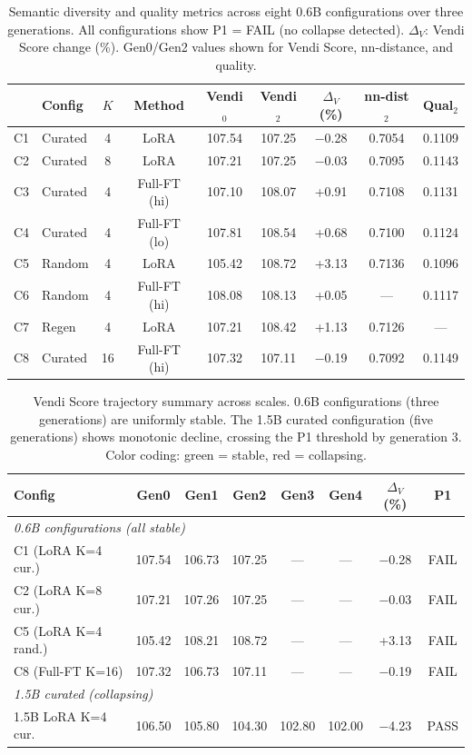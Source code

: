 \documentclass[11pt,a4paper]{article}
\begin{document}
\begin{table}[t]
\centering
\caption{Semantic diversity and quality metrics across eight 0.6B configurations over three generations. All configurations show P1 = FAIL (no collapse detected). $\Delta_V$: Vendi Score change (\%). Gen0/Gen2 values shown for Vendi Score, nn-distance, and quality.}
\label{tab:main}
\small
\begin{tabular}{@{}llccccccc@{}}
\toprule
& Config & $K$ & Method & Vendi$_0$ & Vendi$_2$ & $\Delta_V$(\%) & nn-dist$_2$ & Qual$_2$ \\
\midrule
C1 & Curated & 4 & LoRA & 107.54 & 107.25 & $-$0.28 & 0.7054 & 0.1109 \\
C2 & Curated & 8 & LoRA & 107.21 & 107.25 & $-$0.03 & 0.7095 & 0.1143 \\
C3 & Curated & 4 & Full-FT (hi) & 107.10 & 108.07 & +0.91 & 0.7108 & 0.1131 \\
C4 & Curated & 4 & Full-FT (lo) & 107.81 & 108.54 & +0.68 & 0.7100 & 0.1124 \\
C5 & Random & 4 & LoRA & 105.42 & 108.72 & +3.13 & 0.7136 & 0.1096 \\
C6 & Random & 4 & Full-FT (hi) & 108.08 & 108.13 & +0.05 & --- & 0.1117 \\
C7 & Regen & 4 & LoRA & 107.21 & 108.42 & +1.13 & 0.7126 & --- \\
C8 & Curated & 16 & Full-FT (hi) & 107.32 & 107.11 & $-$0.19 & 0.7092 & 0.1149 \\
\bottomrule
\end{tabular}
\end{table}

\begin{table}[t]
\centering
\caption{Vendi Score trajectory summary across scales. 0.6B configurations (three generations) are uniformly stable. The 1.5B curated configuration (five generations) shows monotonic decline, crossing the P1 threshold by generation 3. Color coding: {\color{safegreen}green} = stable, {\color{dangerred}red} = collapsing.}
\label{tab:vendi_trajectory}
\small
\begin{tabular}{@{}lccccccc@{}}
\toprule
Config & Gen0 & Gen1 & Gen2 & Gen3 & Gen4 & $\Delta_V$(\%) & P1 \\
\midrule
\multicolumn{8}{l}{\textit{0.6B configurations (all {\color{safegreen}stable})}} \\
C1 (LoRA K=4 cur.) & 107.54 & 106.73 & 107.25 & --- & --- & {\color{safegreen}$-$0.28} & FAIL \\
C2 (LoRA K=8 cur.) & 107.21 & 107.26 & 107.25 & --- & --- & {\color{safegreen}$-$0.03} & FAIL \\
C5 (LoRA K=4 rand.) & 105.42 & 108.21 & 108.72 & --- & --- & {\color{safegreen}+3.13} & FAIL \\
C8 (Full-FT K=16) & 107.32 & 106.73 & 107.11 & --- & --- & {\color{safegreen}$-$0.19} & FAIL \\
\midrule
\multicolumn{8}{l}{\textit{1.5B curated ({\color{dangerred}collapsing})}} \\
1.5B LoRA K=4 cur. & 106.50 & 105.80 & 104.30 & 102.80 & 102.00 & {\color{dangerred}$-$4.23} & PASS \\
\bottomrule
\end{tabular}
\end{table}
\end{document}
